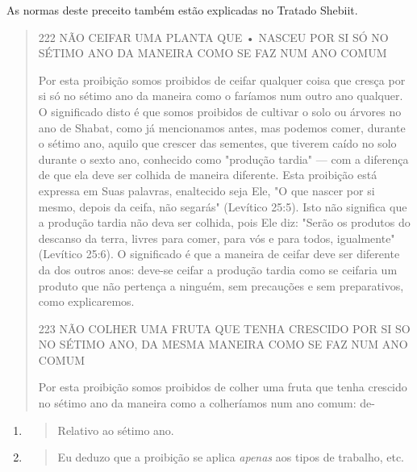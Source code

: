 As normas deste preceito também estão explicadas no Tratado Shebiit.

\begin{quote}
222 NÃO CEIFAR UMA PLANTA QUE • NASCEU POR SI SÓ NO SÉTIMO ANO DA
MANEIRA COMO SE FAZ NUM ANO COMUM

Por esta proibição somos proibidos de ceifar qualquer coisa que cres­ça
por si só no sétimo ano da maneira como o faríamos num outro ano
qual­quer. O significado disto é que somos proibidos de cultivar o solo
ou árvores no ano de Shabat, como já mencionamos antes, mas podemos
comer, durante o sétimo ano, aquilo que crescer das sementes, que
tiverem caído no solo du­rante o sexto ano, conhecido como "produção
tardia" --- com a diferença de que ela deve ser colhida de maneira
diferente. Esta proibição está expressa em Suas palavras, enaltecido
seja Ele, "O que nascer por si mesmo, depois da ceifa, não segarás"
(Levítico 25:5). Isto não significa que a produção tardia não deva ser
colhida, pois Ele diz: "Serão os produtos do descanso da terra, livres
para comer, para vós e para todos, igualmente" (Levítico 25:6). O
significado é que a maneira de ceifar deve ser diferente da dos outros
anos: deve-se ceifar a pro­dução tardia como se ceifaria um produto que
não pertença a ninguém, sem precauções e sem preparativos, como
explicaremos.

223 NÃO COLHER UMA FRUTA QUE TENHA CRESCIDO POR SI SO NO SÉTIMO ANO, DA
MESMA MANEIRA COMO SE FAZ NUM ANO COMUM

Por esta proibição somos proibidos de colher uma fruta que tenha
crescido no sétimo ano da maneira como a colheríamos num ano comum: de-
\end{quote}

\begin{enumerate}
\def\labelenumi{\arabic{enumi}.}
\setcounter{enumi}{390}
\item
  \begin{quote}
  Relativo ao sétimo ano.
  \end{quote}
\item
  \begin{quote}
  Eu deduzo que a proibição se aplica \emph{apenas} aos tipos de
  trabalho, etc.
  \end{quote}
\end{enumerate}

